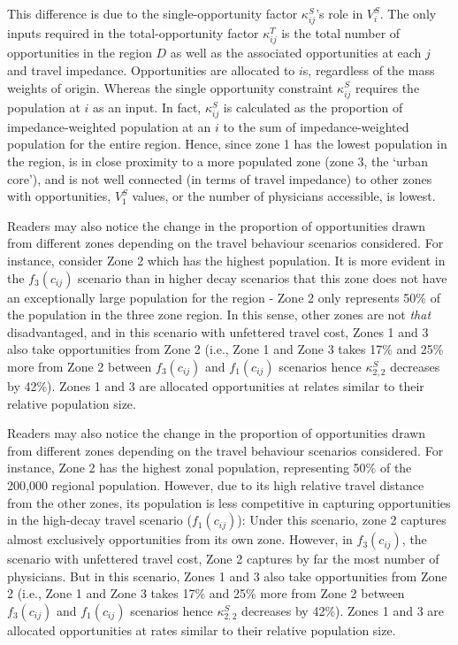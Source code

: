 \documentclass[
11pt, %
oneside, %
english, %
singlespacing, %
]{macthesis} %
\begin{document}
This difference is due to the single-opportunity factor \(\kappa^S_{ij}\)'s role in \(V_i^S\). The only inputs required in the total-opportunity factor \(\kappa^T_{ij}\) is the total number of opportunities in the region \(D\) as well as the associated opportunities at each \(j\) and travel impedance. Opportunities are allocated to \(i\)s, regardless of the mass weights of origin. Whereas the single opportunity constraint \(\kappa^S_{ij}\) requires the population at \(i\) as an input. In fact, \(\kappa^S_{ij}\) is calculated as the proportion of impedance-weighted population at an \(i\) to the sum of impedance-weighted population for the entire region. Hence, since zone 1 has the lowest population in the region, is in close proximity to a more populated zone (zone 3, the `urban core'), and is not well connected (in terms of travel impedance) to other zones with opportunities, \(V_{1}^S\) values, or the number of physicians accessible, is lowest.

Readers may also notice the change in the proportion of opportunities drawn from different zones depending on the travel behaviour scenarios considered. For instance, consider Zone 2 which has the highest population. It is more evident in the \(f_3(c_{ij})\) scenario than in higher decay scenarios that this zone does not have an exceptionally large population for the region - Zone 2 only represents 50\% of the population in the three zone region. In this sense, other zones are not \emph{that} disadvantaged, and in this scenario with unfettered travel cost, Zones 1 and 3 also take opportunities from Zone 2 (i.e., Zone 1 and Zone 3 takes 17\% and 25\% more from Zone 2 between \(f_3(c_{ij})\) and \(f_1(c_{ij})\) scenarios hence \(\kappa_{2,2}^S\) decreases by 42\%). Zones 1 and 3 are allocated opportunities at relates similar to their relative population size.

Readers may also notice the change in the proportion of opportunities drawn from different zones depending on the travel behaviour scenarios considered. For instance, Zone 2 has the highest zonal population, representing 50\% of the 200,000 regional population. However, due to its high relative travel distance from the other zones, its population is less competitive in capturing opportunities in the high-decay travel scenario (\(f_1(c_{ij})\)): Under this scenario, zone 2 captures almost exclusively opportunities from its own zone. However, in \(f_3(c_{ij})\), the scenario with unfettered travel cost, Zone 2 captures by far the most number of physicians. But in this scenario, Zones 1 and 3 also take opportunities from Zone 2 (i.e., Zone 1 and Zone 3 takes 17\% and 25\% more from Zone 2 between \(f_3(c_{ij})\) and \(f_1(c_{ij})\) scenarios hence \(\kappa_{2,2}^S\) decreases by 42\%). Zones 1 and 3 are allocated opportunities at rates similar to their relative population size.
\end{document}
